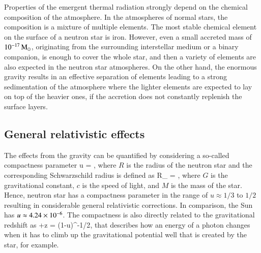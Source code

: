 
Properties of the emergent thermal radiation strongly depend on the chemical composition of the atmosphere.
In the atmospheres of normal stars, the composition is a mixture of multiple elements.
The most stable chemical element on the surface of a neutron star is iron.
However, even a small accreted mass of $10^{-17}\, \mathrm{M}_{\odot}$, originating from the surrounding interstellar medium or a binary companion, is enough to cover the whole star, and then a variety of elements are also expected in the neutron star atmospheres.
On the other hand, the enormous gravity results in an effective separation of elements leading to a strong sedimentation of the atmosphere where the lighter elements are expected to lay on top of the heavier ones, if the accretion does not constantly replenish the surface layers.\cite{AI80}


\subsection{General relativistic effects}
The effects from the gravity can be quantified by considering a so-called compactness parameter
\be
u = ,
\ee
where $R$ is the radius of the neutron star and the corresponding Schwarzschild radius is defined as
\be
R_{} =    \km,
\ee
where $G$ is the gravitational constant, $c$ is the speed of light, and $M$ is the mass of the star.\cite[see e.g.,][]{Gravitation, Wald84}
Hence, neutron star has a compactness parameter in the range of $u \approx 1/3$ to $1/2$ resulting in considerable general relativistic corrections.
In comparison, the Sun has $u \approx 4.24 \times 10^{-6}$.
The compactness is also directly related to the gravitational redshift as
+z = (1-u)^{-1/2},
\ee
that describes how an energy of a photon changes when it has to climb up the gravitational potential well that is created by the star, for example.

